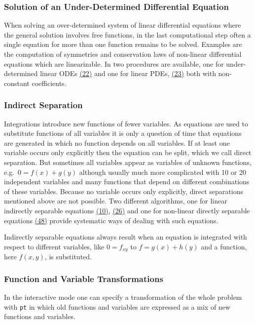 \subsubsection{Solution of an Under-Determined Differential Equation}

When solving an over-determined system of linear differential
equations where the general solution involves free functions, in the
last computational step often a single equation for more than one
function remains to be solved.  Examples are the computation of
symmetries and conservation laws of non-linear differential equations
which are linearizable.  In  two procedures are
available, one for under-determined linear ODEs
\hyperref[crack-m_22]{(22)} and one for linear PDEs,
\hyperref[crack-m_23]{(23)} both with non-constant coefficients.

\subsubsection{Indirect Separation}

Integrations introduce new functions of fewer variables.  As equations
are used to substitute functions of all variables it is only a
question of time that equations are generated in which no function
depends on all variables.  If at least one variable occurs only
explicitly then the equation can be split, which we call direct
separation.  But sometimes all variables appear as variables of
unknown functions, e.g.\ $0=f(x)+g(y)$ although usually much more
complicated with 10 or 20 independent variables and many functions
that depend on different combinations of these variables.  Because no
variable occurs only explicitly, direct separations mentioned above
are not possible.  Two different algorithms, one for linear indirectly
separable equations \hyperref[crack-m_10]{(10)},
\hyperref[crack-m_26]{(26)} and one for non-linear directly separable
equations \hyperref[crack-m_48]{(48)} provide systematic ways of
dealing with such equations.

Indirectly separable equations always result when an equation is
integrated with respect to different variables, like $0=f_{xy}$ to
$f=g(x)+h(y)$ and a function, here $f(x,y)$, is substituted.

\subsubsection{Function and Variable Transformations}

In the interactive mode one can specify a transformation of the whole
problem with \texttt{pt} in which old functions and variables are
expressed as a mix of new functions and variables.

